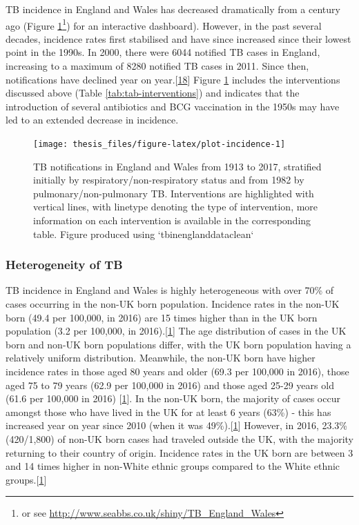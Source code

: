 \documentclass[11pt,twoside]{bristolthesis}
\begin{document}
  TB incidence in England and Wales has decreased dramatically from a century ago (Figure \ref{fig:plot-incidence}\footnote{or see \url{http://www.seabbs.co.uk/shiny/TB_England_Wales}}) for an interactive dashboard). However, in the past several decades, incidence rates first stabilised and have since increased since their lowest point in the 1990s. In 2000, there were 6044 notified TB cases in England, increasing to a maximum of 8280 notified TB cases in 2011. Since then, notifications have declined year on year.{[}\protect\hyperlink{ref-PHE2016a}{18}{]} Figure \ref{fig:plot-incidence} includes the interventions discussed above (Table \ref{tab:tab-interventions}) and indicates that the introduction of several antibiotics and BCG vaccination in the 1950s may have led to an extended decrease in incidence.
  \begin{figure}
  
  {\centering \texttt{[image: thesis\_files/figure-latex/plot-incidence-1]} 
  
  }
  
  \caption[TB notifications in England and Wales from 1913 to 2017, stratified initially by respiratory/non-respiratory status and from 1982 by pulmonary/non-pulmonary TB.]{TB notifications in England and Wales from 1913 to 2017, stratified initially by respiratory/non-respiratory status and from 1982 by pulmonary/non-pulmonary TB. Interventions are highlighted with vertical lines, with linetype denoting the type of intervention, more information on each intervention is available in the corresponding table. Figure produced using `tbinenglanddataclean`}\label{fig:plot-incidence}
  \end{figure}
  \hypertarget{heterogeneity-of-tb}{%
  \subsubsection{Heterogeneity of TB}\label{heterogeneity-of-tb}}
  
  TB incidence in England and Wales is highly heterogeneous with over 70\% of cases occurring in the non-UK born population. Incidence rates in the non-UK born (49.4 per 100,000, in 2016) are 15 times higher than in the UK born population (3.2 per
  100,000, in 2016).{[}\protect\hyperlink{ref-PHE2017}{1}{]} The age distribution of cases in the UK born and non-UK born populations differ, with the UK born population having a relatively uniform distribution. Meanwhile, the non-UK born have higher incidence rates in those aged 80 years and older (69.3 per 100,000 in 2016), those aged 75 to 79 years (62.9 per 100,000 in 2016) and those aged 25-29 years old (61.6 per 100,000 in 2016) {[}\protect\hyperlink{ref-PHE2017}{1}{]}. In the non-UK born, the majority of cases occur amongst those who have lived in the UK for at least 6 years (63\%) - this has increased year on year since 2010 (when it was 49\%).{[}\protect\hyperlink{ref-PHE2017}{1}{]} However, in 2016, 23.3\% (420/1,800) of non-UK born cases had traveled outside the UK, with the majority returning to their country of origin. Incidence rates in the UK born are between 3 and 14 times higher in non-White ethnic groups compared to the White ethnic groups.{[}\protect\hyperlink{ref-PHE2017}{1}{]}
  
\end{document}
